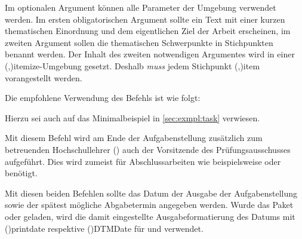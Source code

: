 \begin{DeclareEntity}{}
\begin{Declaration}
Im optionalen Argument können alle Parameter der Umgebung  
verwendet werden. Im ersten obligatorischen Argument sollte ein Text mit einer 
kurzen thematischen Einordnung und dem eigentlichen Ziel der Arbeit erscheinen, 
im zweiten Argument sollen die thematischen Schwerpunkte in Stichpunkten 
benannt werden. Der Inhalt des zweiten notwendigen Argumentes wird in einer 
\Environment(,){itemize}-Umgebung
gesetzt. Deshalb \emph{muss} jedem Stichpunkt 
\Macro(,){item} vorangestellt 
werden.
\end{Declaration}
%
\begin{Example}
Die empfohlene Verwendung des Befehls  ist wie folgt:
\begin{Code}
\end{Code}
Hierzu sei auch auf das Minimalbeispiel in \autoref{sec:exmpl:task} verwiesen.%
\end{Example}

\begin{Declaration}
  {}
\printdeclarationlist

Mit diesem Befehl wird am Ende der Aufgabenstellung zusätzlich zum betreuenden 
Hochschullehrer () auch der Vorsitzende des 
Prüfungsausschusses aufgeführt. Dies wird zumeist für Abschlussarbeiten wie 
beispielsweise \masterthesisname{} oder \diplomathesisname{} benötigt.
\end{Declaration}

\begin{Declaration}
  {}
\begin{Declaration}
  {}
\printdeclarationlist

Mit diesen beiden Befehlen sollte das Datum der Ausgabe der Aufgabenstellung 
sowie der spätest mögliche Abgabetermin angegeben werden. Wurde das Paket 
 oder  geladen, wird die damit eingestellte 
Ausgabeformatierung des Datums mit \Macro(){printdate} 
respektive \Macro(){DTMDate} für  
und  verwendet.
\end{Declaration}
\end{Declaration}
%




\end{DeclareEntity}

